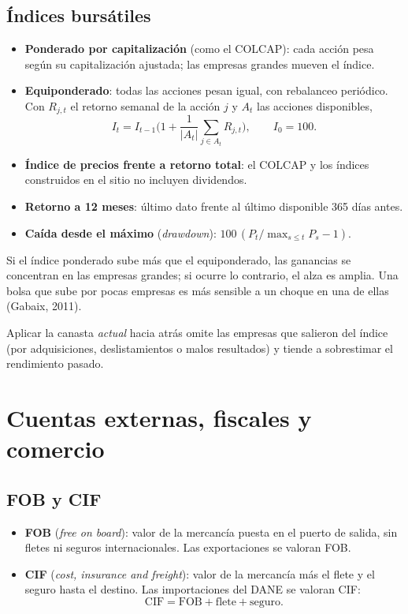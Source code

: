 \section{Índices bursátiles}
\label{es:f:bolsa}
\begin{itemize}
\item \textbf{Ponderado por capitalización} (como el COLCAP): cada acción pesa según su capitalización ajustada; las
  empresas grandes mueven el índice.
\item \textbf{Equiponderado}: todas las acciones pesan igual, con rebalanceo periódico. Con $R_{j,t}$ el retorno
  semanal de la acción $j$ y $A_t$ las acciones disponibles,
  \[
  I_t=I_{t-1}\Big(1+\frac{1}{|A_t|}\sum_{j\in A_t}R_{j,t}\Big),\qquad I_0=100 .
  \]
\item \textbf{Índice de precios frente a retorno total}: el COLCAP y los índices construidos en el sitio no incluyen
  dividendos.
\item \textbf{Retorno a 12 meses}: último dato frente al último disponible 365 días antes.
\item \textbf{Caída desde el máximo} (\emph{drawdown}): $100\,(P_t/\max_{s\le t}P_s-1)$.
\end{itemize}

\begin{leer}
Si el índice ponderado sube más que el equiponderado, las ganancias se concentran en las empresas grandes; si ocurre
lo contrario, el alza es amplia. Una bolsa que sube por pocas empresas es más sensible a un choque en una de ellas
(Gabaix, 2011).
\end{leer}

\begin{alerta}
Aplicar la canasta \emph{actual} hacia atrás omite las empresas que salieron del índice (por adquisiciones,
deslistamientos o malos resultados) y tiende a sobrestimar el rendimiento pasado.
\end{alerta}

\chapter{Cuentas externas, fiscales y comercio}
\label{es:f:externo}

\section{FOB y CIF}
\label{es:f:fobcif}
\begin{itemize}
\item \textbf{FOB} (\emph{free on board}): valor de la mercancía puesta en el puerto de salida, sin fletes ni seguros
  internacionales. Las exportaciones se valoran FOB.
\item \textbf{CIF} (\emph{cost, insurance and freight}): valor de la mercancía más el flete y el seguro hasta el
  destino. Las importaciones del DANE se valoran CIF:
  \[
  \text{CIF}=\text{FOB}+\text{flete}+\text{seguro}.
  \]
\end{itemize}

